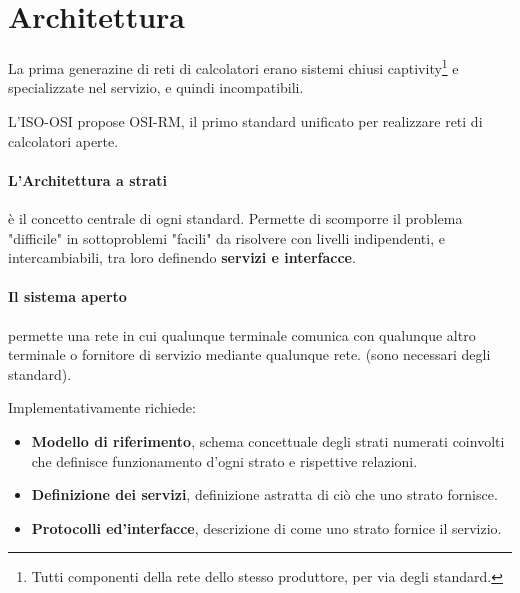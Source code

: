 \section{Architettura}
La prima generazine di reti di calcolatori erano sistemi chiusi captivity\footnote{Tutti componenti della rete dello stesso produttore, per via degli standard.} e specializzate nel servizio, e quindi incompatibili.

L'ISO-OSI propose OSI-RM, il primo standard unificato per realizzare reti di calcolatori aperte.
\paragraph{L'Architettura a strati} è il concetto centrale di ogni standard.
Permette di scomporre il problema "difficile" in sottoproblemi "facili" da risolvere con livelli indipendenti, e intercambiabili, tra loro definendo \textbf{servizi e interfacce}.

\paragraph{Il sistema aperto} permette una rete in cui qualunque terminale comunica con qualunque altro terminale o fornitore di servizio mediante qualunque rete. (sono necessari degli standard).

Implementativamente richiede:
\begin{itemize}
	\item \textbf{Modello di riferimento}, schema concettuale degli strati numerati coinvolti che definisce funzionamento d'ogni strato e rispettive relazioni.
	\item \textbf{Definizione dei servizi}, definizione astratta di ciò che uno strato fornisce.
	\item \textbf{Protocolli ed'interfacce}, descrizione di come uno strato fornice il servizio.
\end{itemize}
